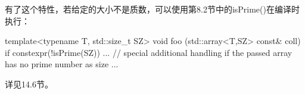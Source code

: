 有了这个特性，若给定的大小不是质数，可以使用第8.2节中的isPrime()在编译时执行：

\begin{cpp}
template<typename T, std::size_t SZ>
void foo (std::array<T,SZ> const& coll) {
	if constexpr(!isPrime(SZ)) {
		... // special additional handling if the passed array has no prime number as size
	}
	...
}
\end{cpp}

详见14.6节。



























